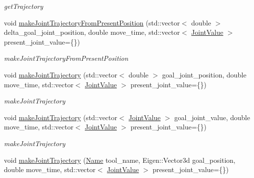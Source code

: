 \begin{DoxyCompactItemize}
\begin{DoxyCompactList}\small\item\em get\+Trajectory \end{DoxyCompactList}\item 
void \hyperlink{classrobotis__manipulator_1_1_robotis_manipulator_a8278c9edbe6ebca76b20a158ef0dd0bf}{make\+Joint\+Trajectory\+From\+Present\+Position} (std\+::vector$<$ double $>$ delta\+\_\+goal\+\_\+joint\+\_\+position, double move\+\_\+time, std\+::vector$<$ \hyperlink{namespacerobotis__manipulator_aa0556c98c5294ccf3a96c2d0fe315e40}{Joint\+Value} $>$ present\+\_\+joint\+\_\+value=\{\})
\begin{DoxyCompactList}\small\item\em make\+Joint\+Trajectory\+From\+Present\+Position \end{DoxyCompactList}\item 
void \hyperlink{classrobotis__manipulator_1_1_robotis_manipulator_a10670957d0b6522651b2494d0296cfd4}{make\+Joint\+Trajectory} (std\+::vector$<$ double $>$ goal\+\_\+joint\+\_\+position, double move\+\_\+time, std\+::vector$<$ \hyperlink{namespacerobotis__manipulator_aa0556c98c5294ccf3a96c2d0fe315e40}{Joint\+Value} $>$ present\+\_\+joint\+\_\+value=\{\})
\begin{DoxyCompactList}\small\item\em make\+Joint\+Trajectory \end{DoxyCompactList}\item 
void \hyperlink{classrobotis__manipulator_1_1_robotis_manipulator_a9d8596bafeda45de9f927fbd2d2e8426}{make\+Joint\+Trajectory} (std\+::vector$<$ \hyperlink{namespacerobotis__manipulator_aa0556c98c5294ccf3a96c2d0fe315e40}{Joint\+Value} $>$ goal\+\_\+joint\+\_\+value, double move\+\_\+time, std\+::vector$<$ \hyperlink{namespacerobotis__manipulator_aa0556c98c5294ccf3a96c2d0fe315e40}{Joint\+Value} $>$ present\+\_\+joint\+\_\+value=\{\})
\begin{DoxyCompactList}\small\item\em make\+Joint\+Trajectory \end{DoxyCompactList}\item 
void \hyperlink{classrobotis__manipulator_1_1_robotis_manipulator_acf9826e7464c56814d3f4faf0d92b80b}{make\+Joint\+Trajectory} (\hyperlink{namespacerobotis__manipulator_a08c2d25e77a01ad75b9bb740f8ce4765}{Name} tool\+\_\+name, Eigen\+::\+Vector3d goal\+\_\+position, double move\+\_\+time, std\+::vector$<$ \hyperlink{namespacerobotis__manipulator_aa0556c98c5294ccf3a96c2d0fe315e40}{Joint\+Value} $>$ present\+\_\+joint\+\_\+value=\{\})

\end{DoxyCompactItemize}
